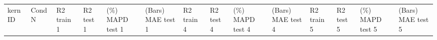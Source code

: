 \documentclass[journal=jacsat,manuscript=article]{achemso}
\begin{document}
\begin{table}[H]
    \centering
    \begin{tabular}{>{\centering\arraybackslash}p{1.0cm}>{\centering\arraybackslash}p{1.0cm}>{\centering\arraybackslash}p{0.75cm}>{\centering\arraybackslash}p{0.75cm}>{\centering\arraybackslash}p{1.0cm}>{\centering\arraybackslash}p{1.0cm}>{\centering\arraybackslash}p{0.75cm}>{\centering\arraybackslash}p{0.75cm}>{\centering\arraybackslash}p{1cm}>{\centering\arraybackslash}p{0.75cm}>{\centering\arraybackslash}p{0.75cm}>{\centering\arraybackslash}p{0.75cm}>{\centering\arraybackslash}p{1cm}>{\centering\arraybackslash}p{0.75cm}}
    \vspace{1.15cm}  kern ID& 
    \vspace{1.15cm} Cond   N& 
    \vspace{0.66cm} R2  train     1&  
    \vspace{0.66cm} R2  test   1& 
    \vspace{0.146cm} (\%) MAPD test \hspace{0.5cm}  1&  
 \vspace{0.146cm} (Bars) MAE test  \hspace{0.5cm}   1&  \vspace{0.66cm} R2 train   4& \vspace{0.66cm} R2 test   4& \vspace{0.146cm} (\%) MAPD test  \hspace{0.5cm}  4&
 \vspace{0.146cm} (Bars) MAE test  \hspace{0.5cm}   4&
 \vspace{0.66cm} R2   train      5&
 \vspace{0.66cm} R2   test     5&
 \vspace{0.146cm} (\%) MAPD test  \hspace{0.5cm}   5&
 \vspace{0.146cm} (Bars) MAE test  \hspace{0.5cm}   5
 


\end{tabular}
\end{table}
\end{document}
